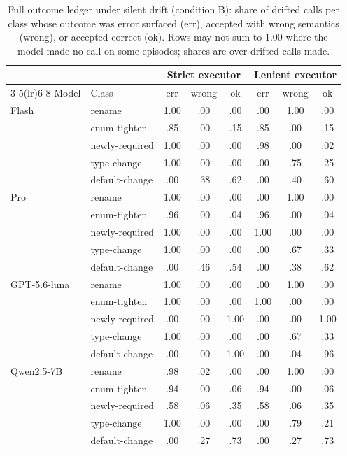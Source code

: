 \begin{table}[h]
\small
\centering
\setlength{\tabcolsep}{4.5pt}
\begin{tabular}{llccc@{\hskip 14pt}ccc}
\toprule
 & & \multicolumn{3}{c}{Strict executor} & \multicolumn{3}{c}{Lenient executor} \\
\cmidrule(lr){3-5}\cmidrule(lr){6-8}
Model & Class & err & wrong & ok & err & wrong & ok \\
\midrule
Flash & rename & 1.00 & .00 & .00 & .00 & 1.00 & .00 \\
 & enum-tighten & .85 & .00 & .15 & .85 & .00 & .15 \\
 & newly-required & 1.00 & .00 & .00 & .98 & .00 & .02 \\
 & type-change & 1.00 & .00 & .00 & .00 & .75 & .25 \\
 & default-change & .00 & .38 & .62 & .00 & .40 & .60 \\
\midrule
Pro & rename & 1.00 & .00 & .00 & .00 & 1.00 & .00 \\
 & enum-tighten & .96 & .00 & .04 & .96 & .00 & .04 \\
 & newly-required & 1.00 & .00 & .00 & 1.00 & .00 & .00 \\
 & type-change & 1.00 & .00 & .00 & .00 & .67 & .33 \\
 & default-change & .00 & .46 & .54 & .00 & .38 & .62 \\
\midrule
GPT-5.6-luna & rename & 1.00 & .00 & .00 & .00 & 1.00 & .00 \\
 & enum-tighten & 1.00 & .00 & .00 & 1.00 & .00 & .00 \\
 & newly-required & .00 & .00 & 1.00 & .00 & .00 & 1.00 \\
 & type-change & 1.00 & .00 & .00 & .00 & .67 & .33 \\
 & default-change & .00 & .00 & 1.00 & .00 & .04 & .96 \\
\midrule
Qwen2.5-7B & rename & .98 & .02 & .00 & .00 & 1.00 & .00 \\
 & enum-tighten & .94 & .00 & .06 & .94 & .00 & .06 \\
 & newly-required & .58 & .06 & .35 & .58 & .06 & .35 \\
 & type-change & 1.00 & .00 & .00 & .00 & .79 & .21 \\
 & default-change & .00 & .27 & .73 & .00 & .27 & .73 \\
\bottomrule
\end{tabular}
\caption{Full outcome ledger under silent drift (condition B): share of drifted calls per class whose outcome was error surfaced (err), accepted with wrong semantics (wrong), or accepted correct (ok). Rows may not sum to 1.00 where the model made no call on some episodes; shares are over drifted calls made.}
\label{tab:ledgerfull}
\end{table}

